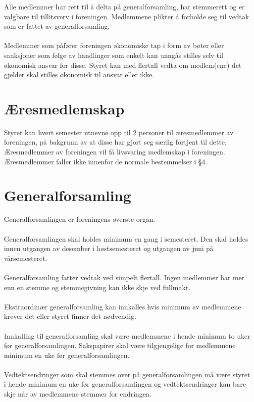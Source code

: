 \documentclass[12pt,a4paper,norsk]{article}
\begin{document}
Alle medlemmer har rett til å delta på generalforsamling, har stemmerett og er valgbare til tillitsverv i
foreningen. Medlemmene plikter å forholde seg til vedtak som er fattet av generalforsamling.
\\
\\
Medlemmer som påfører foreningen økonomiske tap i form av bøter eller sanksjoner som følge 
av handlinger som enkelt kan unngås stilles selv til økonomisk ansvar for disse. Styret kan med  flertall vedta om medlem(ene) det gjelder skal stilles økonomisk til ansvar eller ikke.



\section{Æresmedlemskap}

Styret kan hvert semester utnevne opp til 2 personer til æresmedlemmer av foreningen, på bakgrunn av at disse har gjort seg særlig fortjent til dette. Æresmedlemmer av foreningen vil få livsvaring medlemskap i foreningen. Æresmedlemmer faller ikke innenfor de normale bestemmelser i §4.



\section{Generalforsamling}

Generalforsamlingen er foreningens øverste organ.
\\
\\
Generalforsamlingen skal holdes minimum en gang i semesteret. Den skal holdes innen utgangen av
desember i høstsemesteret og utgangen av juni på vårsemesteret.
\\
\\
Generalforsamling fatter vedtak ved simpelt flertall. Ingen medlemmer har mer enn en stemme
og stemmegivning kan ikke skje ved fullmakt.
\\
\\
Ekstraordinær generalforsamling kan innkalles hvis minimum  av medlemmene krever det
eller styret finner det nødvendig.
\\
\\
Innkalling til generalforsamling skal være medlemmene i hende minimum to uker før
generalforsamlingen. Sakspapirer skal være tilgjengelige for medlemmene minimum en uke før
generalforsamlingen.
\\
\\
Vedtektsendringer som skal stemmes over på generalforsamlingen må være styret i hende
minimum en uke før generalforsamlingen og vedtektsendringer kan bare skje når  av
medlemmene stemmer for endringen.
\end{document}
